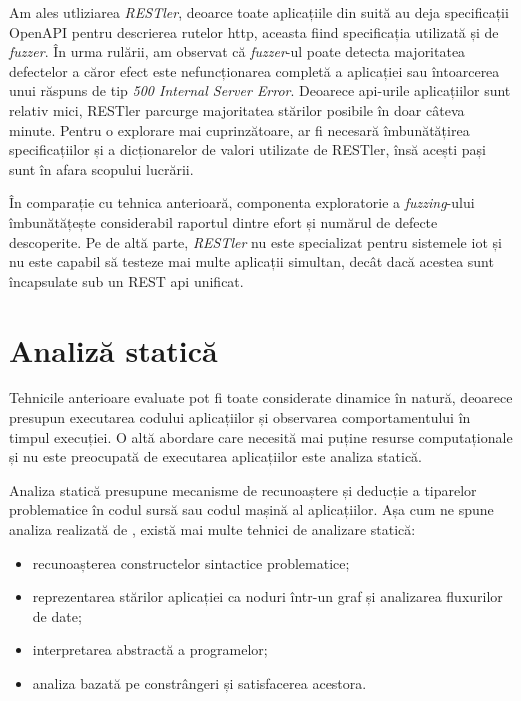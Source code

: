 Am ales utliziarea \textit{RESTler}, deoarce toate aplicațiile din suită au deja specificații OpenAPI pentru descrierea rutelor \acrshort{http}, aceasta fiind specificația utilizată și de \textit{fuzzer}. În urma rulării, am observat că \textit{fuzzer}-ul poate detecta majoritatea defectelor a căror efect este nefuncționarea completă a aplicației sau întoarcerea unui răspuns de tip \textit{500 Internal Server Error}. Deoarece \acrshort{api}-urile aplicațiilor sunt relativ mici, RESTler parcurge majoritatea stărilor posibile în doar câteva minute. Pentru o explorare mai cuprinzătoare, ar fi necesară îmbunătățirea specificațiilor și a dicționarelor de valori utilizate de RESTler, însă acești pași sunt în afara scopului lucrării.

În comparație cu tehnica anterioară, componenta exploratorie a \textit{fuzzing}-ului îmbunătățește considerabil raportul dintre efort și numărul de defecte descoperite. Pe de altă parte, \textit{RESTler} nu este specializat pentru sistemele \acrshort{iot} și nu este capabil să testeze mai multe aplicații simultan, decât dacă acestea sunt încapsulate sub un REST \acrshort{api} unificat.


\section{Analiză statică}

Tehnicile anterioare evaluate pot fi toate considerate dinamice în natură, deoarece presupun executarea codului aplicațiilor și observarea comportamentului în timpul execuției. O altă abordare care necesită mai puține resurse computaționale și nu este preocupată de executarea aplicațiilor este analiza statică. 

Analiza statică presupune mecanisme de recunoaștere și deducție a tiparelor problematice în codul sursă sau codul mașină al aplicațiilor. Așa cum ne spune analiza realizată de \citet{Gosain2015}, există mai multe tehnici de analizare statică:
\begin{itemize}
    \item recunoașterea constructelor sintactice problematice;
    \item reprezentarea stărilor aplicației ca noduri într-un graf și analizarea fluxurilor de date;
    \item interpretarea abstractă a programelor;
    \item analiza bazată pe constrângeri și satisfacerea acestora.
\end{itemize}

